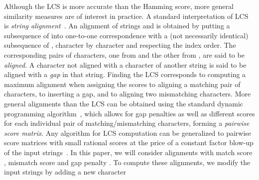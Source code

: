 \documentclass{IOS-Book-Article}     \usepackage{amsmath}
\theoremstyle{plain}
\theoremstyle{definition}
\begin{document}
Although the LCS is more accurate than the Hamming score, 
more general similarity measures are of interest in practice. A standard
interpretation of LCS is \textit{string alignment}~\cite[p. 209 ff.]{Gusfield:97}. 
An alignment of strings  and  is obtained by putting a subsequence of 
into one-to-one correspondence with a (not necessarily identical) subsequence
of , character by character and respecting the index order. The
corresponding pairs of characters, one from  and the other from , are
said to be \textit{aligned}. A character not aligned with a character of
another string is said to be aligned with a \textit{gap} in that string.
Finding the LCS corresponds to computing a maximum alignment when assigning the scores
  to aligning a matching pair of characters,  to
inserting a gap, and  to aligning two mismatching characters.
More general alignments than the LCS can be obtained using the standard dynamic
programming algorithm~\cite{Wagner+:74,Needleman1}, which allows for gap
penalties as well as different scores for each individual pair of matching/mismatching characters,
forming a \textit{pairwise score matrix}. Any algorithm for LCS computation can
be generalized to pairwise score matrices with small rational scores at the
price of a constant factor blow-up of the input
strings~\cite{TiskinL:07:Applications}. In this paper, we will consider
alignments with match score , mismatch score  and gap penalty
.
To compute these alignments, we modify the input strings by adding a new character
\end{document}
